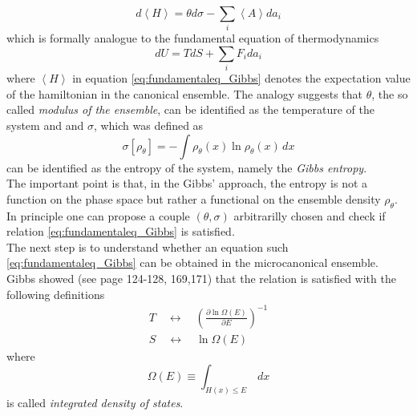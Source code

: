 \begin{equation}
    d\left\langle H \right\rangle = \theta d\sigma - \sum_i \left\langle A \right\rangle da_i
    \label{eq:fundamentaleq_Gibbs}
\end{equation}
which is formally analogue to the fundamental equation of thermodynamics
\begin{equation*}
    dU = TdS + \sum_i F_i da_i
\end{equation*}
where $\left\langle H \right\rangle$ in equation \ref{eq:fundamentaleq_Gibbs} denotes the expectation value of the hamiltonian in the canonical ensemble.
The analogy suggests that $\theta$, the so called \emph{modulus of the ensemble}, can be identified as the temperature of the system and  and $\sigma$, which was defined as
\begin{equation*}
    \sigma[\rho_{\theta}] = - \int \rho_{\theta}(x) \ln \rho_{\theta}(x) \, dx
\end{equation*}
can be identified as the entropy of the system, namely the \emph{Gibbs entropy}. \\
The important point is that, in the Gibbs' approach, the entropy is not a function on the phase space but rather a functional on the ensemble density $\rho_{\theta}$.
In principle one can propose a couple $(\theta, \sigma)$ arbitrarilly chosen and check if relation \ref{eq:fundamentaleq_Gibbs} is satisfied. \\
The next step is to understand whether an equation such \ref{eq:fundamentaleq_Gibbs} can be obtained in the microcanonical ensemble. Gibbs showed (see \cite{gibbs_2010} page 124-128, 169,171) that the relation is satisfied with the following definitions
\begin{gather*}
    T \quad \longleftrightarrow \quad \left(\frac{\partial \ln \Omega(E)}{\partial E}\right)^{-1} \\
    S \quad \longleftrightarrow \quad \ln \Omega(E)
\end{gather*}
where 
\begin{equation}
    \Omega(E) \equiv \int_{H(x) \leq E} \, dx
    \label{eq:Omega_E}
\end{equation}
is called \emph{integrated density of states}. 


